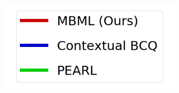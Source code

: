 \begin{figure}[!t]
    \begin{minipage}{0.28\textwidth}
        \begin{figure}[H]
            \centering
            \includegraphics[width=\textwidth]{chapter_2/fig/legend_baseline.png}
        \end{figure}
    \end{minipage}
    \hfill
    \addtocounter{figure}{-1}
    \begin{minipage}{0.69\textwidth}

\end{minipage}
\end{figure}
